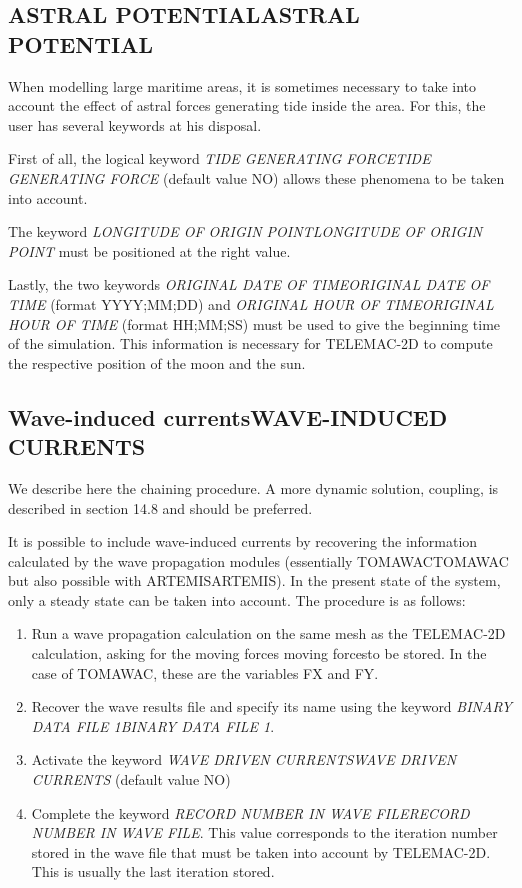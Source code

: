 \documentclass{article} %
\begin{document}
\subsection{ ASTRAL POTENTIALASTRAL POTENTIAL}

 When modelling large maritime areas, it is sometimes necessary to take into account the effect of astral forces generating tide inside the area. For this, the user has several keywords at his disposal.

 First of all, the logical keyword \textit{TIDE GENERATING FORCETIDE GENERATING FORCE} (default value NO) allows these phenomena to be taken into account.

 The keyword \textit{LONGITUDE OF ORIGIN POINTLONGITUDE OF ORIGIN POINT}  must be positioned at the right value.

 Lastly, the two keywords \textit{ORIGINAL DATE OF TIMEORIGINAL DATE OF TIME} (format YYYY;MM;DD) and \textit{ORIGINAL HOUR OF TIMEORIGINAL HOUR OF TIME}  (format HH;MM;SS) must be used to give the beginning time of the simulation. This information is necessary for TELEMAC-2D to compute the respective position of the moon and the sun.


\subsection{ Wave-induced currentsWAVE-INDUCED CURRENTS}

 We describe here the chaining procedure.  A more dynamic solution, coupling, is described in section 14.8 and should be preferred.

 It is possible to include wave-induced currents by recovering the information calculated by the wave propagation modules (essentially TOMAWACTOMAWAC but also possible with ARTEMISARTEMIS). In the present state of the system, only a steady state can be taken into account. The procedure is as follows:

\begin{enumerate}
\item  Run a wave propagation calculation on the same mesh as the TELEMAC-2D calculation, asking for the moving forces moving forcesto be stored. In the case of TOMAWAC, these are the variables FX and FY.

\item  Recover the wave results file and specify its name using the keyword \textit{BINARY DATA FILE 1BINARY DATA FILE 1}.

\item  Activate the keyword \textit{WAVE DRIVEN CURRENTSWAVE DRIVEN CURRENTS} (default value NO)

\item  Complete the keyword \textit{RECORD NUMBER IN WAVE FILERECORD NUMBER IN WAVE FILE}. This value corresponds to the iteration number stored in the wave file that must be taken into account by TELEMAC-2D. This is usually the last iteration stored.
\end{enumerate}
\end{document}
